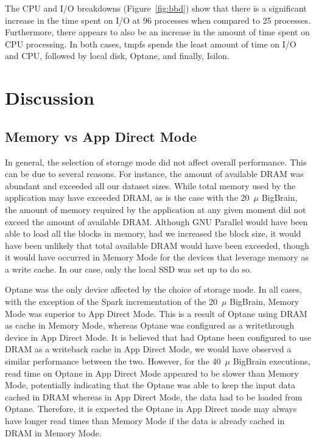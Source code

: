 \documentclass[conference]{IEEEtran}
\newcommand{\bigbrain}{BigBrain\xspace}
\begin{document}
The CPU and I/O breakdowns (Figure~\ref{fig:bbd}) show that there is a significant increase
in the time spent on I/O at 96 processes when compared to 25 processes. Furthermore, there appears
to also be an increase in the amount of time spent on CPU processing. In both cases,
tmpfs spends the least amount of time on I/O and CPU, followed by local disk, Optane, and finally,
Isilon.
\section{Discussion}
\subsection{Memory vs App Direct Mode}

In general, the selection of storage mode did not affect overall performance. This can be
due to several reasons. For instance, the amount of available DRAM was abundant and exceeded 
all our dataset sizes. While total memory used by the application may have exceeded DRAM, as is the
case with the 20~$\mu$ \bigbrain, the amount of memory required by the application at any 
given moment did not exceed the amount of available DRAM. Although GNU Parallel would have
been able to load all the blocks in memory, had we increased the block size, it would have been unlikely
that total available DRAM would have been exceeded, though it would have occurred in Memory Mode
for the devices that leverage memory as a write cache. In our case, only the local SSD was set up to do so.

Optane was the only device affected by the choice of storage mode. In all cases, with the 
exception of the Spark incrementation of the 20~$\mu$ \bigbrain, Memory Mode was superior to 
App Direct Mode. This is a result of Optane using DRAM as cache in Memory Mode, whereas Optane
was configured as a writethrough device in App Direct Mode. It is believed that had Optane been
configured to use DRAM as a writeback cache in App Direct Mode, we  would have observed a similar
performance between the two. However, for the 40~$\mu$ \bigbrain executions, read time on Optane in
App Direct Mode appeared to be slower than Memory Mode, potentially indicating that the Optane was able
to keep the input data cached in DRAM whereas in App Direct Mode, the data had to be loaded from Optane.
Therefore, it is expected the Optane in App Direct mode may always have longer read times than Memory Mode
if the data is already cached in DRAM in Memory Mode.
\end{document}
